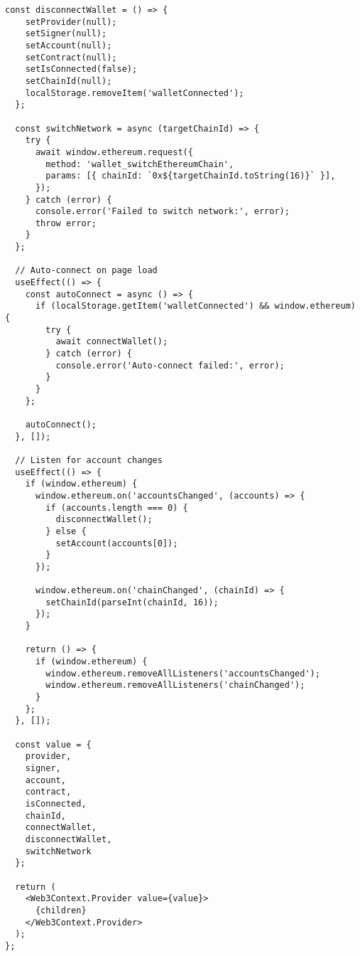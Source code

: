 \documentclass[12pt,a4paper]{article}
\begin{document}
\begin{lstlisting}[caption=Web3 Context Implementation]
  const disconnectWallet = () => {
    setProvider(null);
    setSigner(null);
    setAccount(null);
    setContract(null);
    setIsConnected(false);
    setChainId(null);
    localStorage.removeItem('walletConnected');
  };

  const switchNetwork = async (targetChainId) => {
    try {
      await window.ethereum.request({
        method: 'wallet_switchEthereumChain',
        params: [{ chainId: `0x${targetChainId.toString(16)}` }],
      });
    } catch (error) {
      console.error('Failed to switch network:', error);
      throw error;
    }
  };

  // Auto-connect on page load
  useEffect(() => {
    const autoConnect = async () => {
      if (localStorage.getItem('walletConnected') && window.ethereum) {
        try {
          await connectWallet();
        } catch (error) {
          console.error('Auto-connect failed:', error);
        }
      }
    };

    autoConnect();
  }, []);

  // Listen for account changes
  useEffect(() => {
    if (window.ethereum) {
      window.ethereum.on('accountsChanged', (accounts) => {
        if (accounts.length === 0) {
          disconnectWallet();
        } else {
          setAccount(accounts[0]);
        }
      });

      window.ethereum.on('chainChanged', (chainId) => {
        setChainId(parseInt(chainId, 16));
      });
    }

    return () => {
      if (window.ethereum) {
        window.ethereum.removeAllListeners('accountsChanged');
        window.ethereum.removeAllListeners('chainChanged');
      }
    };
  }, []);

  const value = {
    provider,
    signer,
    account,
    contract,
    isConnected,
    chainId,
    connectWallet,
    disconnectWallet,
    switchNetwork
  };

  return (
    <Web3Context.Provider value={value}>
      {children}
    </Web3Context.Provider>
  );
};
\end{lstlisting}
\end{document}
